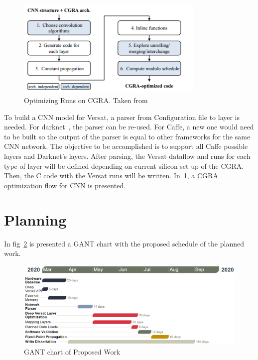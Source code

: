 \begin{figure}[!htbp]
    \centering
    \includegraphics[width=0.8\textwidth]{Figures/cgraopt.png}
    \caption{Optimizing Runs on CGRA. Taken from ~\cite{cgraopt}}
    \label{figure:cgraopt}
\end{figure}

\quad To build a CNN model for Versat, a parser from Configuration file to layer is needed. For darknet~\cite{darknet}, the parser can be re-used.
For Caffe, a new one would need to be built so the output of the parser is equal to other frameworks for the same CNN network.
The objective to be accomplished is to support all Caffe possible layers and Darknet's layers.
After parsing, the Versat dataflow and runs for each type of layer will be defined depending on current silicon set up of the CGRA. Then,
the C code with the Versat runs will be written. In~\ref{figure:cgraopt}, a CGRA optimization flow for CNN is presented.


\section{Planning}

\quad In fig~\ref{figure:gant} is presented a GANT chart with the proposed schedule of the planned work.

\begin{figure}[!htbp]
    \includegraphics[width=1\textwidth]{Figures/gant2.png}
    \caption{GANT chart of Proposed Work}
    \label{figure:gant}
\end{figure}





